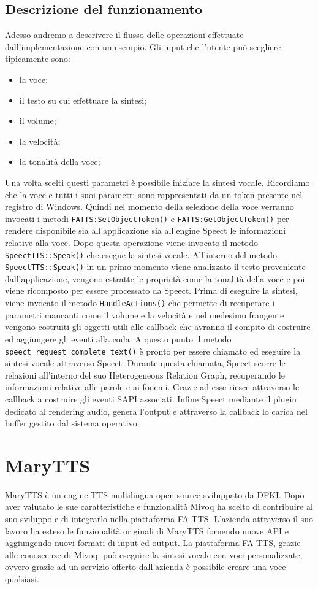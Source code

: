 \subsection{Descrizione del funzionamento}
Adesso andremo a descrivere il flusso delle operazioni effettuate dall'implementazione con un esempio.
Gli input che l'utente può scegliere tipicamente sono:
\begin{itemize}
	\item la voce;
	\item il testo su cui effettuare la sintesi;
	\item il volume;
	\item la velocità;
	\item la tonalità della voce;
\end{itemize}
Una volta scelti questi parametri è possibile iniziare la sintesi vocale. Ricordiamo che la voce e tutti i suoi parametri sono rappresentati da un token presente nel registro di Windows.
Quindi nel momento della selezione della voce verranno invocati i metodi \texttt{FATTS:SetObjectToken()} e \texttt{FATTS:GetObjectToken()} per rendere disponibile sia all'applicazione sia all'engine Speect le informazioni relative alla voce.
Dopo questa operazione viene invocato il metodo \texttt{SpeectTTS::Speak()} che esegue la sintesi vocale.
All'interno del metodo \texttt{SpeectTTS::Speak()} in un primo momento viene analizzato il testo proveniente dall'applicazione, vengono estratte le proprietà come la tonalità della voce e poi viene ricomposto per essere processato da Speect.
Prima di eseguire la sintesi, viene invocato il metodo \texttt{HandleActions()} che permette di recuperare i parametri mancanti come il volume e la velocità e nel medesimo frangente vengono costruiti gli oggetti utili alle callback che avranno il compito di costruire ed aggiungere gli eventi alla coda.
A questo punto il metodo \texttt{speect\_request\_complete\_text()} è pronto per essere chiamato ed eseguire la sintesi vocale attraverso Speect.
Durante questa chiamata, Speect scorre le relazioni all'interno del suo Heterogeneous Relation Graph, recuperando le informazioni relative alle parole e ai fonemi. Grazie ad esse riesce attraverso le callback a costruire gli eventi SAPI associati.
Infine Speect mediante il plugin dedicato al rendering audio, genera l'output e attraverso la callback lo carica nel buffer gestito dal sistema operativo.

\section{MaryTTS}
MaryTTS è un engine TTS multilingua open-source sviluppato da DFKI. Dopo aver valutato le sue caratteristiche e funzionalità Mivoq ha scelto di contribuire al suo sviluppo e di integrarlo nella piattaforma FA-TTS.
L'azienda attraverso il suo lavoro ha esteso le funzionalità originali di MaryTTS fornendo nuove API e aggiungendo nuovi formati di input ed output.
La piattaforma FA-TTS, grazie alle conoscenze di Mivoq, può eseguire la sintesi vocale con voci personalizzate, ovvero grazie ad un servizio offerto dall'azienda è possibile creare una voce qualsiasi.
